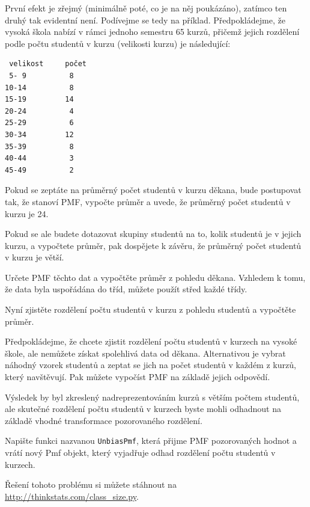 \documentclass[12pt]{book}
\begin{document}
První efekt je zřejmý (minimálně poté, co je na něj poukázáno), zatímco ten druhý
tak evidentní není.  Podívejme se tedy na příklad. Předpokládejme, že vysoká škola nabízí v rámci jednoho semestru 65 kurzů, přičemž jejich rozdělení podle počtu studentů v kurzu (velikosti kurzu) je následující:
%
\begin{verbatim}
 velikost     počet
 5- 9          8
10-14          8
15-19         14
20-24          4
25-29          6
30-34         12
35-39          8
40-44          3
45-49          2
\end{verbatim}

Pokud se zeptáte na průměrný počet studentů v kurzu děkana, bude postupovat tak, že stanoví PMF, vypočte průměr a uvede, že průměrný počet studentů v kurzu je 24.

Pokud se ale budete dotazovat skupiny studentů na to, kolik studentů je v jejich kurzu, a vypočtete průměr, pak dospějete k závěru, že průměrný počet studentů v kurzu je větší.

\begin{exercise}
Určete PMF těchto dat a vypočtěte průměr z pohledu děkana. Vzhledem k tomu, že data byla uspořádána do tříd, můžete použít střed každé třídy.

Nyní zjistěte rozdělení počtu studentů v kurzu z pohledu studentů a vypočtěte průměr.

Předpokládejme, že chcete zjistit rozdělení počtu studentů v kurzech na vysoké škole, ale nemůžete získat spolehlivá data od děkana. Alternativou je vybrat náhodný vzorek studentů a zeptat se jich na počet studentů v každém z kurzů, který navštěvují. Pak můžete vypočíst PMF na základě jejich odpovědí.

Výsledek by byl zkreslený nadreprezentováním kurzů s větším počtem studentů, ale skutečné rozdělení počtu studentů v kurzech byste mohli odhadnout na základě vhodné transformace pozorovaného rozdělení.

Napište funkci nazvanou \verb"UnbiasPmf", která přijme PMF pozorovaných hodnot a vrátí nový
Pmf objekt, který vyjadřuje odhad rozdělení počtu studentů v kurzech.

Řešení tohoto problému si můžete stáhnout na
\url{http://thinkstats.com/class_size.py}.

\end{exercise}
\end{document}
